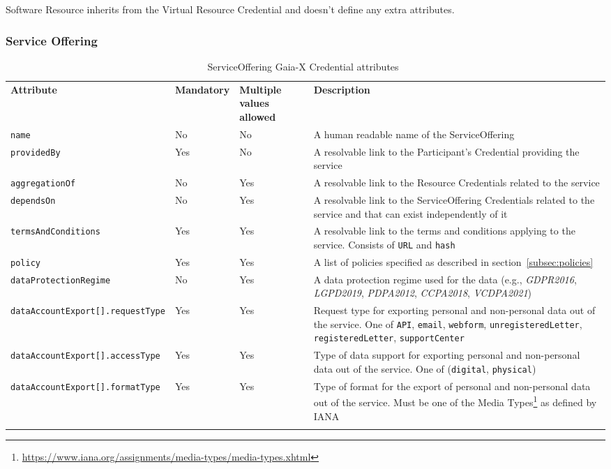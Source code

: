 Software Resource inherits from the Virtual Resource Credential and doesn't define any extra attributes.

\subsubsection{Service Offering}

\begin{longtable}{ |p{4cm}|p{2cm}|p{2cm}|p{7cm}| }
    \hhline{----}
    \textbf{Attribute} & \textbf{Mandatory} & \textbf{Multiple values allowed} & \textbf{Description}\\
    \hhline{----}
    \texttt{name} & No & No & A human readable name of the ServiceOffering\\
    \hhline{----}
    \texttt{providedBy} & Yes & No & A resolvable link to the Participant's Credential providing the service\\
    \hhline{----}
    \texttt{aggregationOf} & No & Yes & A resolvable link to the Resource Credentials related to the service\\
    \hhline{----}
    \texttt{dependsOn} & No & Yes & A resolvable link to the ServiceOffering Credentials related to the service and that can exist independently of it\\
    \hhline{----}
    \texttt{termsAndConditions} & Yes & Yes & A resolvable link to the terms and conditions applying to the service.
    Consists of \texttt{URL} and \texttt{hash}\\
    \hhline{----}
    \texttt{policy} & Yes & Yes & A list of policies specified as described in section~\ref{subsec:policies}\\
    \hhline{----}
    \texttt{dataProtectionRegime} & No & Yes & A data protection regime used for the data (e.g., \textit{GDPR2016}, \textit{LGPD2019}, \textit{PDPA2012}, \textit{CCPA2018}, \textit{VCDPA2021})\\
    \hhline{----}
    \texttt{dataAccountExport[].requestType} & Yes & Yes & Request type for exporting personal and non-personal data out of the service.
    One of \texttt{API}, \texttt{email}, \texttt{webform}, \texttt{unregisteredLetter}, \texttt{registeredLetter}, \texttt{supportCenter}\\
    \hhline{----}
    \texttt{dataAccountExport[].accessType} & Yes & Yes & Type of data support for exporting personal and non-personal data out of the service.
    One of (\texttt{digital}, \texttt{physical})\\
    \hhline{----}
    \texttt{dataAccountExport[].formatType} & Yes & Yes & Type of format for the export of personal and non-personal data out of the service.
    Must be one of the Media Types\footnote{\url{https://www.iana.org/assignments/media-types/media-types.xhtml}} as defined by IANA\\
    \hhline{----}
    \caption{ServiceOffering Gaia-X Credential attributes~\cite{gaiax_trust_framework}}
    \label{tab:service_offering}
\end{longtable}

